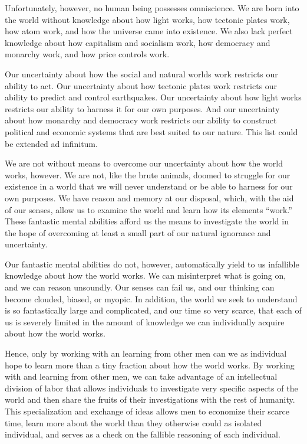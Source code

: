 Unfortunately, however, no human being possesses omniscience. We are born into the world without knowledge about how light works, how tectonic plates work, how atom work, and how the universe came into existence. We also lack perfect knowledge about how capitalism and socialism work, how democracy and monarchy work, and how price controls work.

Our uncertainty about how the social and natural worlds work restricts our ability to act. Our uncertainty about how tectonic plates work restricts our ability to predict and control earthquakes. Our uncertainty about how light works restricts our ability to harness it for our own purposes. And our uncertainty about how monarchy and democracy work restricts our ability to construct political and economic systems that are best suited to our nature. This list could be extended ad infinitum.

We are not without means to overcome our uncertainty about how the world works, however. We are not, like the brute animals, doomed to struggle for our existence in a world that we will never understand or be able to harness for our own purposes. We have reason and memory at our disposal, which, with the aid of our senses, allow us to examine the world and learn how its elements ``work.'' These fantastic mental abilities afford us the means to investigate the world in the hope of overcoming at least a small part of our natural ignorance and uncertainty.

Our fantastic mental abilities do not, however, automatically yield to us infallible knowledge about how the world works. We can misinterpret what is going on, and we can reason unsoundly. Our senses can fail us, and our thinking can become clouded, biased, or myopic. In addition, the world we seek to understand is so fantastically large and complicated, and our time so very scarce, that each of us is severely limited in the amount of knowledge we can individually acquire about how the world works.

Hence, only by working with an learning from other men can we as individual hope to learn more than a tiny fraction about how the world works. By working with and learning from other men, we can take advantage of an intellectual division of labor that allows individuals to investigate very specific aspects of the world and then share the fruits of their investigations with the rest of humanity. This specialization and exchange of ideas allows men to economize their scarce time, learn more about the world than they otherwise could as isolated individual, and serves as a check on the fallible reasoning of each individual.

